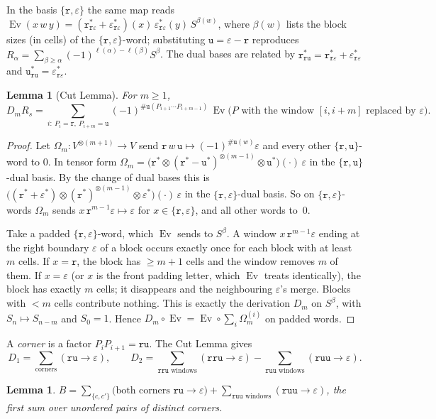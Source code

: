 \documentclass[11pt]{amsart}
\newcommand{\Ev}{\operatorname{Ev}}
\newcommand{\tr}{\mathtt{r}}
\newcommand{\tu}{\mathtt{u}}
\newcommand{\te}{\varepsilon}
\theoremstyle{plain}
\newtheorem{lemma}[theorem]{Lemma}
\theoremstyle{definition}
\begin{document}
In the basis $\{\tr,\te\}$ the same map reads $\Ev(x\,w\,y)=(\tr^*_{\tr\te}+\te^*_{\tr\te})(x)\,\te^*_{\tr\te}(y)\,S^{\beta(w)}$, where $\beta(w)$ lists the block sizes (in cells) of the $\{\tr,\te\}$-word; substituting $\tu=\te-\tr$ reproduces $R_\alpha=\sum_{\beta\ge\alpha}(-1)^{\ell(\alpha)-\ell(\beta)}S^\beta$. The dual bases are related by $\tr^*_{\tr\tu}=\tr^*_{\tr\te}+\te^*_{\tr\te}$ and $\tu^*_{\tr\tu}=\te^*_{\tr\te}$.

\begin{lemma}[Cut Lemma]\label{lem:cut}
For $m\ge1$,
\[
D_mR_s=\sum_{i:\ P_i=\tr,\ P_{i+m}=\tu}(-1)^{\#\tu(P_{i+1}\cdots P_{i+m-1})}\,\Ev\bigl(P\text{ with the window }[i,i+m]\text{ replaced by }\te\bigr).
\]
\end{lemma}

\begin{proof}
Let $\Omega_m:V^{\otimes(m+1)}\to V$ send $\tr\,w\,\tu\mapsto(-1)^{\#\tu(w)}\te$ and every other $\{\tr,\tu\}$-word to $0$. In tensor form $\Omega_m=\bigl(\tr^*\otimes(\tr^*-\tu^*)^{\otimes(m-1)}\otimes\tu^*\bigr)(\cdot)\,\te$ in the $\{\tr,\tu\}$-dual basis. By the change of dual bases this is $\bigl((\tr^*+\te^*)\otimes(\tr^*)^{\otimes(m-1)}\otimes\te^*\bigr)(\cdot)\,\te$ in the $\{\tr,\te\}$-dual basis. So on $\{\tr,\te\}$-words $\Omega_m$ sends $x\,\tr^{m-1}\te\mapsto\te$ for $x\in\{\tr,\te\}$, and all other words to~$0$.

Take a padded $\{\tr,\te\}$-word, which $\Ev$ sends to $S^\beta$. A window $x\,\tr^{m-1}\te$ ending at the right boundary $\te$ of a block occurs exactly once for each block with at least $m$ cells. If $x=\tr$, the block has $\ge m+1$ cells and the window removes $m$ of them. If $x=\te$ (or $x$ is the front padding letter, which $\Ev$ treats identically), the block has exactly $m$ cells; it disappears and the neighbouring $\te$'s merge. Blocks with $<m$ cells contribute nothing. This is exactly the derivation $D_m$ on $S^\beta$, with $S_n\mapsto S_{n-m}$ and $S_0=1$. Hence $D_m\circ\Ev=\Ev\circ\sum_i\Omega_m^{(i)}$ on padded words.
\end{proof}

A \emph{corner} is a factor $P_iP_{i+1}=\tr\tu$. The Cut Lemma gives
\[
D_1=\sum_{\text{corners}}(\tr\tu\to\te),\qquad D_2=\sum_{\tr\tr\tu\text{ windows}}(\tr\tr\tu\to\te)-\sum_{\tr\tu\tu\text{ windows}}(\tr\tu\tu\to\te).
\]

\begin{lemma}\label{lem:B}
$B=\sum_{\{c,c'\}}\bigl(\text{both corners }\tr\tu\to\te\bigr)+\sum_{\tr\tu\tu\text{ windows}}(\tr\tu\tu\to\te)$, the first sum over unordered pairs of distinct corners.
\end{lemma}
\end{document}
